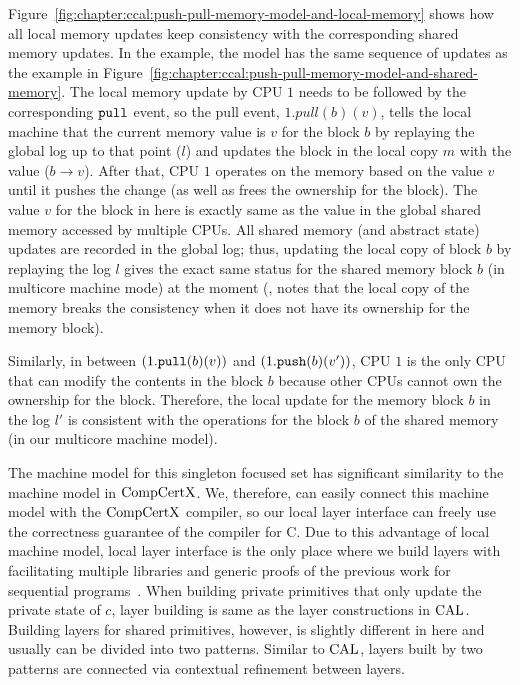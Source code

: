 Figure~\ref{fig:chapter:ccal:push-pull-memory-model-and-local-memory} shows how
all local memory updates keep consistency with the corresponding shared memory updates. 
In the example, the model has the same sequence of updates as the example 
in Figure~\ref{fig:chapter:ccal:push-pull-memory-model-and-shared-memory}.
The local memory update by CPU $1$ needs to be followed by the corresponding ${\mathrm{\texttt{pull}}}$ event, 
so the pull event, $1.pull(b)(v)$, tells the local machine that the current memory value is 
$v$ for the block $b$ by replaying the global log up to that point ($l$)
and updates the block in the local copy $m$ with the value ($b \rightarrow v$). 
After that, CPU $1$ operates on the memory based on the value $v$ until it pushes the change (as well as frees the ownership for the block).
The value $v$ for the block in here is exactly same as the value in the global shared memory accessed by multiple CPUs. 
All shared memory (and abstract state) updates are recorded in the global log; thus,
updating the local copy of block $b$ by replaying the log $l$ gives the exact same status for the shared memory block $b$ (in multicore machine mode) at the moment
(\ie, notes that the local copy of the memory breaks the consistency when it does not have its ownership for the memory block). 

Similarly,  in between $(1.{\mathrm{\texttt{pull}}}(b)(v))$ and $(1.{\mathrm{\texttt{push}}}(b)(v'))$, 
CPU $1$ is the only  CPU that can modify the contents in the block $b$
because other CPUs cannot own the ownership for the block.
Therefore, the local update for the memory block $b$ in the log $l'$ 
is consistent with the operations for the block $b$ of the shared memory (in our multicore machine model).

The machine model for this singleton focused set has significant similarity to the machine model in $\mathrm{CompCertX}$. 
We, therefore, can easily connect this machine model with the $\mathrm{CompCertX}$ compiler, 
so our local layer interface can freely use the correctness guarantee of the compiler for C. 
Due to this advantage of local machine model, local layer interface is the only place where we build layers with facilitating multiple libraries and generic proofs of the previous work for sequential programs~\cite{deepspec}. 
When building private primitives that only update the private state of $c$, 
layer building is same as the layer constructions in $\mathrm{CAL}$.
Building layers for shared primitives, however, is slightly different in here and usually can be divided into 
two patterns. 
Similar to $\mathrm{CAL}$, layers built by two patterns are connected via contextual refinement between layers. 

